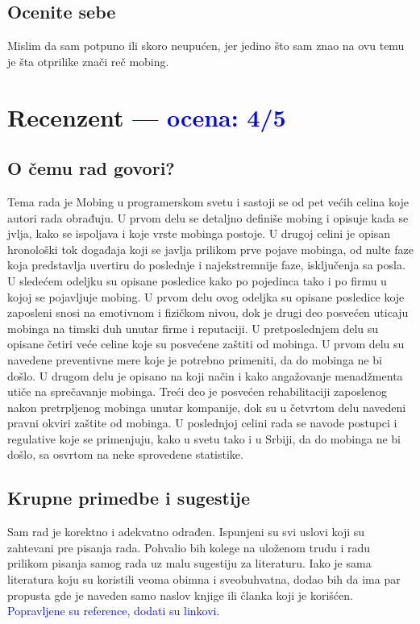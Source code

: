 \documentclass[a4paper]{report}
\newcommand{\odgovor}[1]{\textcolor{blue}{#1}}
\begin{document}
\section{Ocenite sebe}
Mislim da sam potpuno ili skoro neupućen, jer jedino što sam znao na ovu temu je šta otprilike znači reč mobing.

\chapter{Recenzent \odgovor{--- ocena: 4/5}}


\section{O čemu rad govori?}

Tema rada je Mobing u programerskom svetu i sastoji se od pet većih celina koje autori rada obrađuju. U prvom delu se detaljno definiše mobing i opisuje kada se jvlja, kako se ispoljava i koje vrste mobinga postoje. U drugoj celini je opisan hronološki tok događaja koji se javlja prilikom prve pojave mobinga, od nulte faze koja predstavlja uvertiru do poslednje i najekstremnije faze, isključenja sa posla. U sledećem odeljku su opisane posledice kako po pojedinca tako i po firmu u kojoj se pojavljuje mobing. U prvom delu ovog odeljka su opisane posledice koje zaposleni snosi na emotivnom i fizičkom nivou, dok je drugi deo posvećen uticaju mobinga na timski duh unutar firme i reputaciji. U pretposlednjem delu su opisane četiri veće celine koje su posvećene zaštiti od mobinga. U prvom delu su navedene preventivne mere koje je potrebno primeniti, da do mobinga ne bi došlo. U drugom delu je opisano na koji način i kako angažovanje menadžmenta utiče na sprečavanje mobinga. Treći deo je posvećen rehabilitaciji zaposlenog nakon pretrpljenog mobinga unutar kompanije, dok su u četvrtom delu navedeni pravni okviri zaštite od mobinga. U poslednjoj celini rada se navode postupci i regulative koje se primenjuju, kako u svetu tako i u Srbiji, da do mobinga ne bi došlo, sa osvrtom na neke sprovedene statistike.
\section{Krupne primedbe i sugestije}

Sam rad je korektno i adekvatno odrađen. Ispunjeni su svi uslovi koji su zahtevani pre pisanja rada. Pohvalio bih kolege na uloženom trudu i radu prilikom pisanja samog rada uz malu sugestiju za literaturu. Iako je sama literatura koju su koristili veoma obimna i sveobuhvatna, dodao bih da ima par propusta gde je naveden samo naslov knjige ili članka koji je korišćen. \odgovor{Popravljene su reference, dodati su linkovi.}
\end{document}
